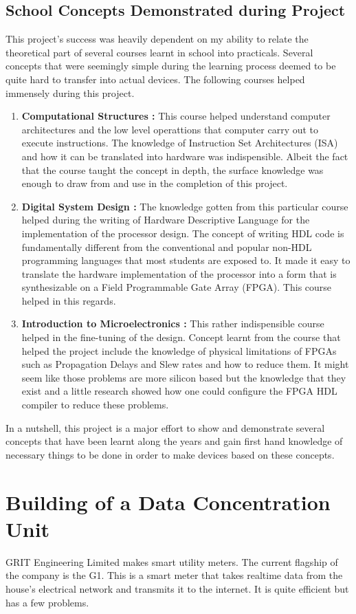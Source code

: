 \subsection{School Concepts Demonstrated during Project}
This project's success was heavily dependent on my ability to relate the theoretical part of several courses learnt in school into practicals. Several concepts that were seemingly simple during the learning process deemed to be quite hard to transfer into actual devices. The following courses helped immensely during this project.
\begin{enumerate}
\item \textbf{Computational Structures :} This course helped understand computer architectures and the low level operattions that computer carry out to execute instructions. The knowledge of Instruction Set Architectures (ISA) and how it can be translated into hardware was indispensible. Albeit the fact that the course taught the concept in depth, the surface knowledge was enough to draw from and use in the completion of this project.
\item \textbf{Digital System Design :} The knowledge gotten from this particular course helped during the writing of Hardware Descriptive Language for the implementation of the processor design. The concept of writing HDL code is fundamentally different from the conventional and popular non-HDL programming languages that most students are exposed to. It made it easy to translate the hardware implementation of the processor into a form that is synthesizable on a Field Programmable Gate Array (FPGA). This course helped in this regards.
\item \textbf{Introduction to Microelectronics :} This rather indispensible course helped in the fine-tuning of the design. Concept learnt from the course that helped the project include the knowledge of physical limitations of FPGAs such as Propagation Delays and Slew rates and how to reduce them. It might seem like those problems are more silicon based but the knowledge that they exist and a little research showed how one could configure the FPGA HDL compiler to reduce these problems.
\end{enumerate}
In a nutshell, this project is a major effort to show and demonstrate several concepts that have been learnt along the years and gain first hand knowledge of necessary things to be done in order to make devices based on these concepts.

\section[DCU]{Building of a Data Concentration Unit}
GRIT Engineering Limited makes smart utility meters. The current flagship of the company is the G1. This is a smart meter that takes realtime data from the house's electrical network and transmits it to the internet. It is quite efficient but has a few problems. 


